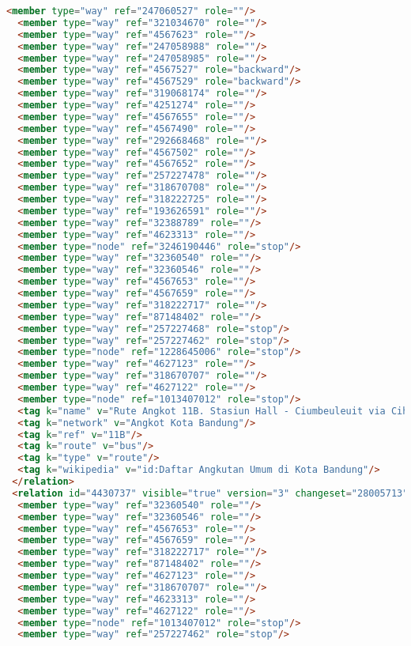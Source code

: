 \begin{lstlisting}[language=HTML,basicstyle=\tiny,caption=test.xml]
  <member type="way" ref="247060527" role=""/>
  <member type="way" ref="321034670" role=""/>
  <member type="way" ref="4567623" role=""/>
  <member type="way" ref="247058988" role=""/>
  <member type="way" ref="247058985" role=""/>
  <member type="way" ref="4567527" role="backward"/>
  <member type="way" ref="4567529" role="backward"/>
  <member type="way" ref="319068174" role=""/>
  <member type="way" ref="4251274" role=""/>
  <member type="way" ref="4567655" role=""/>
  <member type="way" ref="4567490" role=""/>
  <member type="way" ref="292668468" role=""/>
  <member type="way" ref="4567502" role=""/>
  <member type="way" ref="4567652" role=""/>
  <member type="way" ref="257227478" role=""/>
  <member type="way" ref="318670708" role=""/>
  <member type="way" ref="318222725" role=""/>
  <member type="way" ref="193626591" role=""/>
  <member type="way" ref="32388789" role=""/>
  <member type="way" ref="4623313" role=""/>
  <member type="node" ref="3246190446" role="stop"/>
  <member type="way" ref="32360540" role=""/>
  <member type="way" ref="32360546" role=""/>
  <member type="way" ref="4567653" role=""/>
  <member type="way" ref="4567659" role=""/>
  <member type="way" ref="318222717" role=""/>
  <member type="way" ref="87148402" role=""/>
  <member type="way" ref="257227468" role="stop"/>
  <member type="way" ref="257227462" role="stop"/>
  <member type="node" ref="1228645006" role="stop"/>
  <member type="way" ref="4627123" role=""/>
  <member type="way" ref="318670707" role=""/>
  <member type="way" ref="4627122" role=""/>
  <member type="node" ref="1013407012" role="stop"/>
  <tag k="name" v="Rute Angkot 11B. Stasiun Hall - Ciumbeuleuit via Cihampelas &quot;LURUS&quot;"/>
  <tag k="network" v="Angkot Kota Bandung"/>
  <tag k="ref" v="11B"/>
  <tag k="route" v="bus"/>
  <tag k="type" v="route"/>
  <tag k="wikipedia" v="id:Daftar Angkutan Umum di Kota Bandung"/>
 </relation>
 <relation id="4430737" visible="true" version="3" changeset="28005713" timestamp="2015-01-08T20:32:48Z" user="isonpurba" uid="2552445">
  <member type="way" ref="32360540" role=""/>
  <member type="way" ref="32360546" role=""/>
  <member type="way" ref="4567653" role=""/>
  <member type="way" ref="4567659" role=""/>
  <member type="way" ref="318222717" role=""/>
  <member type="way" ref="87148402" role=""/>
  <member type="way" ref="4627123" role=""/>
  <member type="way" ref="318670707" role=""/>
  <member type="way" ref="4623313" role=""/>
  <member type="way" ref="4627122" role=""/>
  <member type="node" ref="1013407012" role="stop"/>
  <member type="way" ref="257227462" role="stop"/>

\end{lstlisting}

